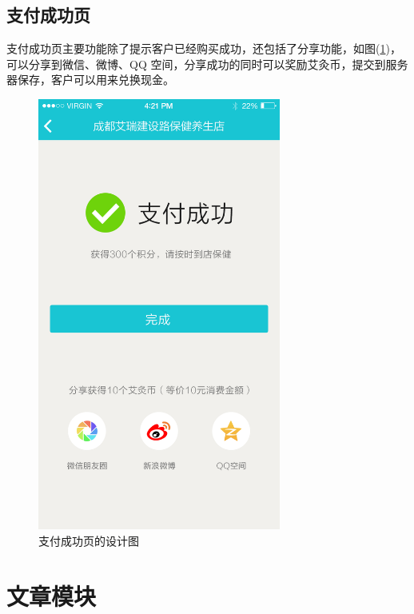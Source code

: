     \subsection{支付成功页}
      \label{subsec:支付成功页}
        支付成功页主要功能除了提示客户已经购买成功，还包括了分享功能，如图(\ref{fig:pay_successful_dsn})，可以分享到微信、微博、QQ 空间，分享成功的同时可以奖励艾灸币，提交到服务器保存，客户可以用来兑换现金。
        \begin{figure}[htbp]
          \centering
          \includegraphics[width=8cm]{./img/pay_successful_dsn.png}
          \caption{支付成功页的设计图}
          \label{fig:pay_successful_dsn}
        \end{figure}

\clearpage
\section{文章模块}
  \label{sec:文章模块}
